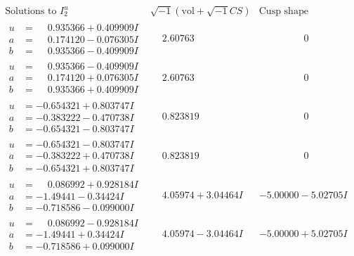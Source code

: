 \documentclass[1p]{elsarticle_modified}
\theoremstyle{definition}
\newcommand{\I}{\sqrt{-1}}
\begin{document}
$$\begin{array}{c|c|c}  
\text{Solutions to }I^u_{2}& \I (\text{vol} + \sqrt{-1}CS) & \text{Cusp shape}\\
 \hline 
\begin{aligned}
u &= \phantom{-}0.935366 + 0.409909 I \\
a &= \phantom{-}0.174120 - 0.076305 I \\
b &= \phantom{-}0.935366 - 0.409909 I\end{aligned}
 & \phantom{-}2.60763\phantom{ +0.000000I} & \phantom{-0.000000 } 0 \\ \hline\begin{aligned}
u &= \phantom{-}0.935366 - 0.409909 I \\
a &= \phantom{-}0.174120 + 0.076305 I \\
b &= \phantom{-}0.935366 + 0.409909 I\end{aligned}
 & \phantom{-}2.60763\phantom{ +0.000000I} & \phantom{-0.000000 } 0 \\ \hline\begin{aligned}
u &= -0.654321 + 0.803747 I \\
a &= -0.383222 - 0.470738 I \\
b &= -0.654321 - 0.803747 I\end{aligned}
 & \phantom{-}0.823819\phantom{ +0.000000I} & \phantom{-0.000000 } 0 \\ \hline\begin{aligned}
u &= -0.654321 - 0.803747 I \\
a &= -0.383222 + 0.470738 I \\
b &= -0.654321 + 0.803747 I\end{aligned}
 & \phantom{-}0.823819\phantom{ +0.000000I} & \phantom{-0.000000 } 0 \\ \hline\begin{aligned}
u &= \phantom{-}0.086992 + 0.928184 I \\
a &= -1.49441 - 0.34424 I \\
b &= -0.718586 - 0.099000 I\end{aligned}
 & \phantom{-}4.05974 + 3.04464 I & -5.00000 - 5.02705 I \\ \hline\begin{aligned}
u &= \phantom{-}0.086992 - 0.928184 I \\
a &= -1.49441 + 0.34424 I \\
b &= -0.718586 + 0.099000 I\end{aligned}
 & \phantom{-}4.05974 - 3.04464 I & -5.00000 + 5.02705 I \\ \hline\begin{aligned}

\end{aligned}
\end{array}$$
\end{document}
